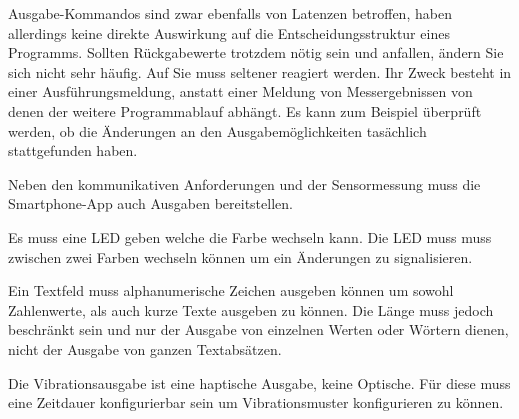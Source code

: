 \documentclass[11pt,a4paper]{report}
\begin{document}
Ausgabe-Kommandos sind zwar ebenfalls von Latenzen betroffen, haben allerdings keine direkte Auswirkung auf die Entscheidungsstruktur eines Programms.
Sollten Rückgabewerte trotzdem nötig sein und anfallen, ändern Sie sich nicht sehr häufig.
Auf Sie muss seltener reagiert werden.
Ihr Zweck besteht in einer Ausführungsmeldung, anstatt einer Meldung von Messergebnissen von denen der weitere Programmablauf abhängt.
Es kann zum Beispiel überprüft werden, ob die Änderungen an den Ausgabemöglichkeiten tasächlich stattgefunden haben.

Neben den kommunikativen Anforderungen und der Sensormessung muss die Smartphone-App auch Ausgaben bereitstellen.

Es muss eine LED geben welche die Farbe wechseln kann.
Die LED muss muss zwischen zwei Farben wechseln können um ein Änderungen zu signalisieren.

Ein Textfeld muss alphanumerische Zeichen ausgeben können um sowohl Zahlenwerte, als auch kurze Texte ausgeben zu können.
Die Länge muss jedoch beschränkt sein und nur der Ausgabe von einzelnen Werten oder Wörtern dienen, nicht der Ausgabe von ganzen Textabsätzen.

Die Vibrationsausgabe ist eine haptische Ausgabe, keine Optische.
Für diese muss eine Zeitdauer konfigurierbar sein um Vibrationsmuster konfigurieren zu können.
\end{document}
